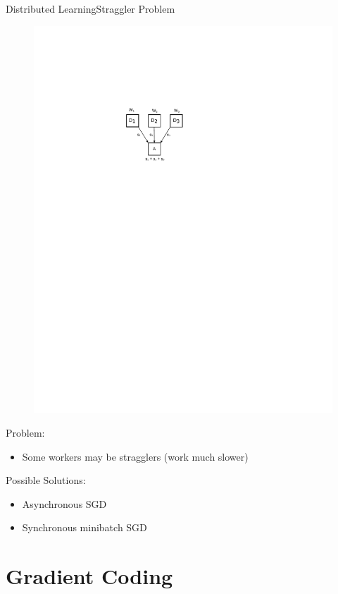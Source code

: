 \documentclass{beamer}
\begin{document}
\begin{frame}{Distributed Learning}{Straggler Problem}

\begin{figure}
    \centering
    \includegraphics[height=.5\textheight]{res/distributed_learning.pdf}
\end{figure}

Problem:
\begin{itemize}
    \item Some workers may be stragglers (work much slower)
\end{itemize}

Possible Solutions:
\begin{itemize}
    \item Asynchronous SGD
    \item Synchronous minibatch SGD
\end{itemize}

\end{frame}

\section{Gradient Coding}
\end{document}
